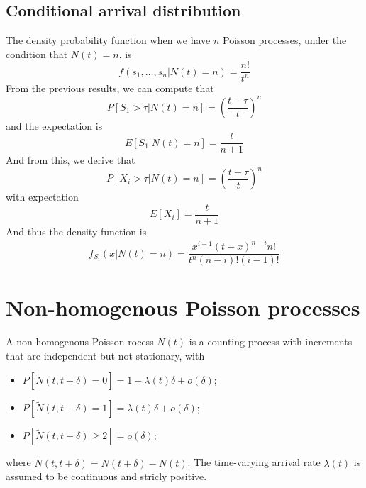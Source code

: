 \documentclass[12pt, openany]{report}
\theoremstyle{definition}
\begin{document}
\subsection{Conditional arrival distribution}
The density probability function when we have $n$ Poisson processes, under the condition that $N(t)=n$, is
\begin{equation}
  f(s_1,\dots,s_n|N(t)=n)=\frac{n!}{t^n}
\end{equation}
From the previous results, we can compute that 
\begin{equation}
  P[S_1>\tau|N(t)=n]=\left(\frac{t-\tau}{t}\right)^n
\end{equation}
and the expectation is 
\begin{equation}
  E[S_1|N(t)=n] = \frac{t}{n+1}
\end{equation}
And from this, we derive that 
\begin{equation}
  P[X_i>\tau|N(t)=n] = \left(\frac{t-\tau}{t}\right)^n
\end{equation}
with expectation 
\begin{equation}
  E[X_i] = \frac{t}{n+1}
\end{equation}
And thus the density function is 
\begin{equation}
  f_{S_i}(x|N(t)=n) = \frac{x^{i-1}(t-x)^{n-i}n!}{t^n (n-i)!(i-1)!}
\end{equation}
\section{Non-homogenous Poisson processes}
A non-homogenous Poisson rocess $N(t)$ is a counting process with increments that are independent but not stationary, with
\begin{itemize}
  \item $P[\tilde N(t,t+\delta)=0]=1-\lambda (t)\delta + o(\delta)$;
  \item $P[\tilde N(t,t+\delta)=1]=\lambda (t)\delta + o(\delta)$;
  \item $P[\tilde N(t,t+\delta)\ge2]=o(\delta)$;
\end{itemize}
where $\tilde N(t,t+\delta)=N(t+\delta)-N(t)$. The time-varying arrival rate $\lambda(t)$ is assumed to be continuous and stricly positive.
\end{document}

